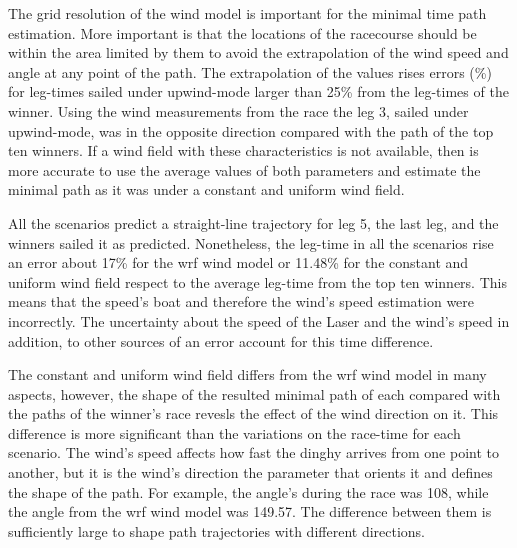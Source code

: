 The grid resolution of the wind model is important for the minimal time path estimation. More important is that the locations of the racecourse should be within the area limited by them to avoid the extrapolation of the wind speed and angle at any point of the path. The extrapolation of the values rises errors (\%) for leg-times sailed under upwind-mode larger than 25\% from the leg-times of the winner. %
Using the wind measurements from the race the leg 3, sailed under upwind-mode, was in the opposite direction compared with the path of the top ten winners.  If a wind field with these characteristics is not available, then is more accurate to use the average values of both parameters and estimate the minimal path as it was under a constant and uniform wind field. \par 

All the scenarios predict a straight-line trajectory for leg 5, the last leg, and the winners sailed it as predicted. Nonetheless, the leg-time in all the scenarios rise an error about 17\% for the \acrshort{wrf} wind model or 11.48\% for the constant and uniform wind field %
respect to the average leg-time from the top ten winners. This means that the speed's boat and therefore the wind's speed estimation were incorrectly. The uncertainty about the speed of the Laser and the wind's speed in addition, to other sources of an error account for this time difference. \par   %
The constant and uniform wind field differs from the \acrshort{wrf} wind model in many aspects, however, the shape of the resulted minimal path of each compared with the paths of the winner's race revesls the effect of the wind direction on it. This difference is more significant than the variations on the race-time for each scenario. The wind's speed affects how fast the dinghy arrives from one point to another, but it is the wind's direction the parameter that orients it and defines the shape of the path. For example, the angle's during the race was 108\degree, while the angle from the \acrshort{wrf} wind model was 149.57\degree. The difference between them is sufficiently large to shape path trajectories with different directions. \par %
